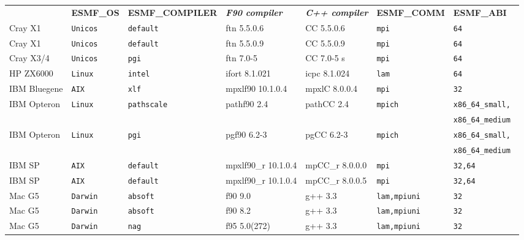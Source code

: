 \begin{tabular}{lllllll}
  &{\bfseries\footnotesize ESMF\_OS} &{\bfseries\footnotesize ESMF\_COMPILER} & {\bfseries\footnotesize\it F90 compiler} & {\bfseries\footnotesize\it C++ compiler} & {\bfseries\footnotesize ESMF\_COMM} & {\bfseries\footnotesize ESMF\_ABI} \\

Cray X1         &\tt Unicos &\tt default & ftn \footnotesize 5.5.0.6 & CC \footnotesize 5.5.0.6 &\tt mpi &\tt 64 \\
Cray X1         &\tt Unicos &\tt default & ftn \footnotesize 5.5.0.9 & CC \footnotesize 5.5.0.9 &\tt mpi &\tt 64 \\
Cray X3/4       &\tt Unicos &\tt pgi     & ftn \footnotesize 7.0-5   & CC \footnotesize 7.0-5 s &\tt mpi &\tt 64 \\
HP ZX6000       &\tt Linux  &\tt intel   & ifort \footnotesize 8.1.021 & icpc \footnotesize 8.1.024 &\tt lam &\tt 64 \\
IBM Bluegene    &\tt AIX    &\tt xlf     & mpxlf90 \footnotesize 10.1.0.4 & mpxlC \footnotesize 8.0.0.4 &\tt mpi &\tt 32 \\
IBM Opteron     &\tt Linux  &\tt pathscale & pathf90 \footnotesize 2.4 & pathCC \footnotesize 2.4 &\tt mpich &\tt x86\_64\_small, \\
                &           &              &                           &                          &          &\tt x86\_64\_medium \\
IBM Opteron     &\tt Linux  &\tt pgi     & pgf90 \footnotesize 6.2-3 & pgCC \footnotesize 6.2-3 &\tt mpich   &\tt x86\_64\_small, \\
                &           &            &                           &                          &            &\tt x86\_64\_medium \\
IBM SP          &\tt AIX    &\tt default & mpxlf90\_r \footnotesize 10.1.0.4 & mpCC\_r \footnotesize 8.0.0.0 &\tt mpi &\tt 32,64 \\
IBM SP          &\tt AIX    &\tt default & mpxlf90\_r \footnotesize 10.1.0.4 & mpCC\_r \footnotesize 8.0.0.5 &\tt mpi &\tt 32,64 \\
Mac G5          &\tt Darwin &\tt absoft  & f90 \footnotesize 9.0     & g++ \footnotesize 3.3    &\tt lam,mpiuni &\tt 32 \\
Mac G5          &\tt Darwin &\tt absoft  & f90 \footnotesize 8.2     & g++ \footnotesize 3.3    &\tt lam,mpiuni &\tt 32 \\
Mac G5          &\tt Darwin &\tt nag     & f95 \footnotesize 5.0(272)& g++ \footnotesize 3.3    &\tt lam,mpiuni &\tt 32 \\

\end{tabular}
